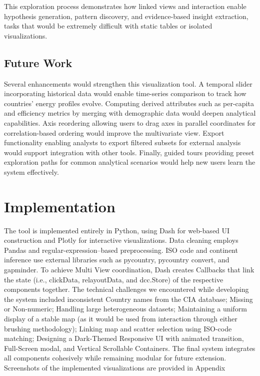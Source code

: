 \documentclass[conference]{IEEEtran}
\begin{document}
This exploration process demonstrates how linked views and interaction enable hypothesis generation, pattern discovery, and evidence-based insight extraction, tasks that would be extremely difficult with static tables or isolated visualizations.

\subsection{Future Work}

Several enhancements would strengthen this visualization tool. A temporal slider incorporating historical data would enable time-series comparison to track how countries' energy profiles evolve. Computing derived attributes such as per-capita and efficiency metrics by merging with demographic data would deepen analytical capabilities. Axis reordering allowing users to drag axes in parallel coordinates for correlation-based ordering would improve the multivariate view. Export functionality enabling analysts to export filtered subsets for external analysis would support integration with other tools. Finally, guided tours providing preset exploration paths for common analytical scenarios would help new users learn the system effectively.

\section{Implementation}
The tool is implemented entirely in Python, using Dash for web-based UI construction and Plotly for interactive visualizations. Data cleaning employs Pandas and regular-expression–based preprocessing. ISO code and continent inference use external libraries such as pycountry, pycountry convert, and gapminder. To achieve Multi View coordination, Dash creates Callbacks that link the state (i.e., clickData, relayoutData, and dcc.Store) of the respective components together. The technical challenges we encountered while developing the system included inconsistent Country names from the CIA database; Missing or Non-numeric; Handling large heterogeneous datasets; Maintaining a uniform display of a stable map (as it would be used from interaction through either brushing methodology); Linking map and scatter selection using ISO-code matching; Designing a Dark-Themed Responsive UI with animated transition, Full-Screen modal, and Vertical Scrollable Containers. The final system integrates all components cohesively while remaining modular for future extension. Screenshots of the implemented visualizations are provided in Appendix
\end{document}
